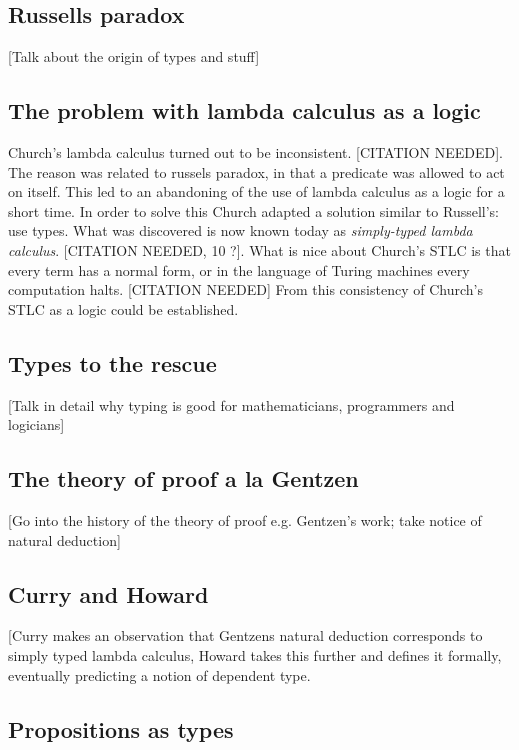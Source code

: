 \subsection{Russells paradox}

[Talk about the origin of types and stuff]

\subsection{The problem with lambda calculus as a logic}

Church's lambda calculus turned out to be inconsistent. \cite{}[CITATION NEEDED]. The reason was related to russels paradox, in that a predicate was allowed to act on itself. This led to an abandoning of the use of lambda calculus as a logic for a short time. In order to solve this Church adapted a solution similar to Russell's: use types. What was discovered is now known today as \emph{simply-typed lambda calculus}. \cite{} [CITATION NEEDED, 10 ?]. What is nice about Church's STLC is that every term has a normal form, or in the language of Turing machines every computation halts. \cite{} [CITATION NEEDED] From this consistency of Church's STLC as a logic could be established.

\subsection{Types to the rescue}

[Talk in detail why typing is good for mathematicians, programmers and logicians]

\subsection{The theory of proof a la Gentzen}

[Go into the history of the theory of proof e.g. Gentzen's work; take notice of natural deduction]

\subsection{Curry and Howard}

[Curry makes an observation that Gentzens natural deduction corresponds to simply typed lambda calculus, Howard takes this further and defines it formally, eventually predicting a notion of dependent type.

\subsection{Propositions as types}

